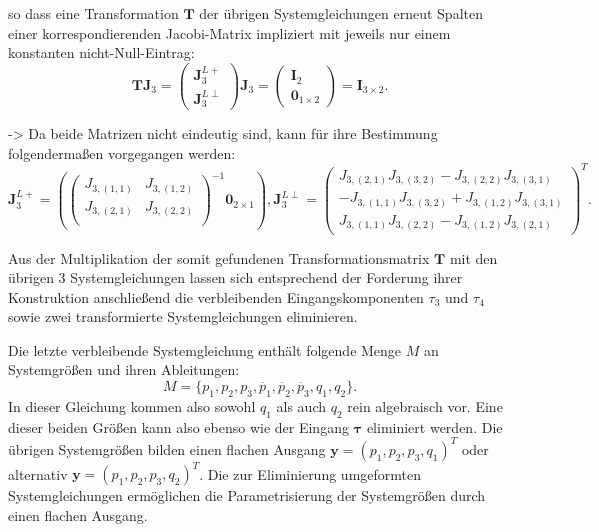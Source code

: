 so dass eine Transformation $\mathbf{T}$ der übrigen Systemgleichungen erneut Spalten einer korrespondierenden Jacobi-Matrix impliziert mit jeweils nur einem konstanten nicht-Null-Eintrag:
\begin{equation}
	\mathbf{T} \mathbf{J}_3 =
	\left(\begin{matrix}
		\mathbf{J}_3^{L+} \\
		\mathbf{J}_3^{L \perp}
	\end{matrix}\right)
	\mathbf{J}_3 =
	\left(\begin{matrix}
		\mathbf{I}_{2} \\
		\mathbf{0}_{1 \times 2}
	\end{matrix}\right)
	=
	\mathbf{I}_{3 \times 2}. 
\end{equation}

-> Da beide Matrizen nicht eindeutig sind, kann für ihre Bestimmung folgendermaßen vorgegangen werden: 
\begin{equation}
	\mathbf{J}_3^{L+} =
	\left(
	\left(\begin{matrix}
		J_{3, (1,1)} & J_{3, (1,2)}\\
		J_{3, (2,1)} & J_{3, (2,2)}\\
	\end{matrix}\right)^{-1}	
	\mathbf{0}_{2 \times 1}
	\right), 		
	\mathbf{J}_3^{L\perp} =
	\left(\begin{matrix}
		J_{3, (2,1)} J_{3, (3,2)} - J_{3, (2,2)} J_{3, (3,1)} \\
		-J_{3, (1,1)} J_{3, (3,2)} + J_{3, (1,2)} J_{3, (3,1)} \\
		J_{3, (1,1)} J_{3, (2,2)} - J_{3, (1,2)} J_{3, (2,1)}
	\end{matrix}\right)^T.
\end{equation}

Aus der Multiplikation der somit gefundenen Transformationsmatrix $\mathbf{T}$ mit den übrigen 3 Systemgleichungen lassen sich entsprechend der Forderung ihrer Konstruktion anschließend die verbleibenden Eingangskomponenten $\tau_{3}$ und $\tau_{4}$ sowie zwei transformierte Systemgleichungen eliminieren.

Die letzte verbleibende Systemgleichung enthält folgende Menge $M$ an Systemgrößen und ihren Ableitungen:
\begin{equation}
	M = \{p_1, p_2, p_3, \ddot{p_1}, \ddot{p_2}, \ddot{p_3}, q_1, q_2 \}.
\end{equation}
In dieser Gleichung kommen also sowohl $q_1$ als auch $q_2$ rein algebraisch vor. Eine dieser beiden Größen kann also ebenso wie der Eingang $\mathbf{\tau}$ eliminiert werden. Die übrigen Systemgrößen bilden einen flachen Ausgang $\mathbf{y} = (p_1, p_2, p_3, q_1)^T$ oder alternativ $\mathbf{y} = (p_1, p_2, p_3, q_2)^T$. Die zur Eliminierung umgeformten Systemgleichungen ermöglichen die Parametrisierung der Systemgrößen durch einen flachen Ausgang.

